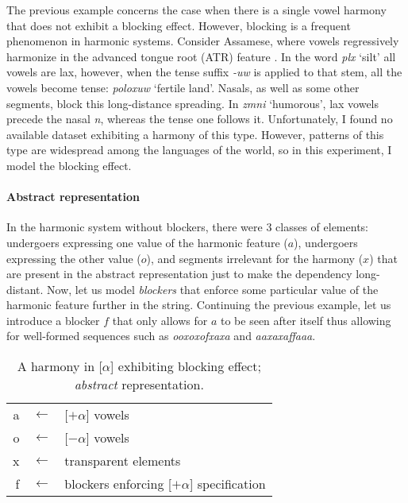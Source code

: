 The previous example concerns the case when there is a single vowel harmony that does not exhibit a blocking effect.
However, blocking is a frequent phenomenon in harmonic systems.
Consider Assamese, where vowels regressively harmonize in the advanced tongue root (ATR) feature \citep{Mahanta07}.
In the word \emph{p\textopeno l\textopeno x} `silt' all vowels are lax, however, when the tense suffix \emph{-uw\textturna} is applied to that stem, all the vowels become tense: \emph{poloxuw\textturna} `fertile land'.
Nasals, as well as some other segments, block this long-distance spreading.
In \emph{z\textopeno m\textopeno ni} `humorous', lax vowels precede the nasal \emph{n}, whereas the tense one follows it.
Unfortunately, I found no available dataset exhibiting a harmony of this type.
However, patterns of this type are widespread among the languages of the world, so in this experiment, I model the blocking effect.

\paragraph{Abstract representation}

In the harmonic system without blockers, there were $3$ classes of elements: undergoers expressing one value of the harmonic feature ($a$), undergoers expressing the other value ($o$), and segments irrelevant for the harmony ($x$) that are present in the abstract representation just to make the dependency long-distant.
Now, let us model \emph{blockers} that enforce some particular value of the harmonic feature further in the string.
Continuing the previous example, let us introduce a blocker $f$ that only allows for $a$ to be seen after itself thus allowing for well-formed sequences such as \emph{ooxoxofxaxa} and \emph{aaxaxaffaaa}.

\begin{table}[h!]
\begin{center}
\begin{tabular}{rcl}
a & $\leftarrow$ & {[}$+\alpha${]} vowels \\
o & $\leftarrow$ & {[}$-\alpha${]} vowels \\
x & $\leftarrow$ & transparent elements \\
f & $\leftarrow$ & blockers enforcing {[}$+\alpha${]} specification
\end{tabular}
\end{center}
\caption{A harmony in {[}$\alpha${]} exhibiting blocking effect; \emph{abstract} representation.}
\label{vhwbmap}
\end{table}

